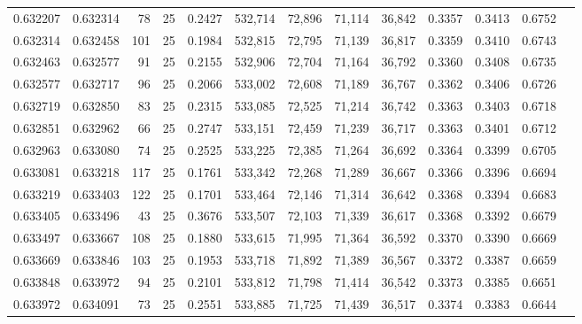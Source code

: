 \begin{tabular}{rrrrrrrrrrrrr}
0.632207 & 0.632314 &    78 &  25 &                                     0.2427 & 532,714 &  72,896 &  71,114 &  36,842 & 0.3357 & 0.3413 & 0.6752 \\
0.632314 & 0.632458 &   101 &  25 &                                     0.1984 & 532,815 &  72,795 &  71,139 &  36,817 & 0.3359 & 0.3410 & 0.6743 \\
0.632463 & 0.632577 &    91 &  25 &                                     0.2155 & 532,906 &  72,704 &  71,164 &  36,792 & 0.3360 & 0.3408 & 0.6735 \\
0.632577 & 0.632717 &    96 &  25 &                                     0.2066 & 533,002 &  72,608 &  71,189 &  36,767 & 0.3362 & 0.3406 & 0.6726 \\
0.632719 & 0.632850 &    83 &  25 &                                     0.2315 & 533,085 &  72,525 &  71,214 &  36,742 & 0.3363 & 0.3403 & 0.6718 \\
0.632851 & 0.632962 &    66 &  25 &                                     0.2747 & 533,151 &  72,459 &  71,239 &  36,717 & 0.3363 & 0.3401 & 0.6712 \\
0.632963 & 0.633080 &    74 &  25 &                                     0.2525 & 533,225 &  72,385 &  71,264 &  36,692 & 0.3364 & 0.3399 & 0.6705 \\
0.633081 & 0.633218 &   117 &  25 &                                     0.1761 & 533,342 &  72,268 &  71,289 &  36,667 & 0.3366 & 0.3396 & 0.6694 \\
0.633219 & 0.633403 &   122 &  25 &                                     0.1701 & 533,464 &  72,146 &  71,314 &  36,642 & 0.3368 & 0.3394 & 0.6683 \\
0.633405 & 0.633496 &    43 &  25 &                                     0.3676 & 533,507 &  72,103 &  71,339 &  36,617 & 0.3368 & 0.3392 & 0.6679 \\
0.633497 & 0.633667 &   108 &  25 &                                     0.1880 & 533,615 &  71,995 &  71,364 &  36,592 & 0.3370 & 0.3390 & 0.6669 \\
0.633669 & 0.633846 &   103 &  25 &                                     0.1953 & 533,718 &  71,892 &  71,389 &  36,567 & 0.3372 & 0.3387 & 0.6659 \\
0.633848 & 0.633972 &    94 &  25 &                                     0.2101 & 533,812 &  71,798 &  71,414 &  36,542 & 0.3373 & 0.3385 & 0.6651 \\
0.633972 & 0.634091 &    73 &  25 &                                     0.2551 & 533,885 &  71,725 &  71,439 &  36,517 & 0.3374 & 0.3383 & 0.6644 \\

\end{tabular}

